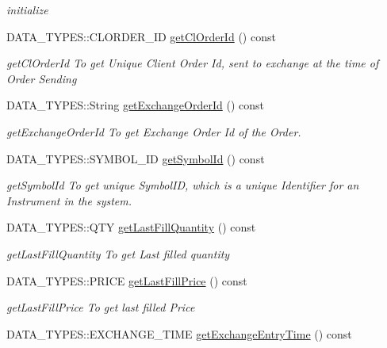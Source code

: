 \begin{DoxyCompactItemize}
\begin{DoxyCompactList}\small\item\em initialize \end{DoxyCompactList}\item 
D\-A\-T\-A\-\_\-\-T\-Y\-P\-E\-S\-::\-C\-L\-O\-R\-D\-E\-R\-\_\-\-I\-D \hyperlink{class_a_p_i2_1_1_order_confirmation_ac927e0347cdc6686a89478626c979a35}{get\-Cl\-Order\-Id} () const 
\begin{DoxyCompactList}\small\item\em get\-Cl\-Order\-Id To get Unique Client Order Id, sent to exchange at the time of Order Sending \end{DoxyCompactList}\item 
D\-A\-T\-A\-\_\-\-T\-Y\-P\-E\-S\-::\-String \hyperlink{class_a_p_i2_1_1_order_confirmation_a092cb6b14b04e741f1dedd08ef5af5ab}{get\-Exchange\-Order\-Id} () const 
\begin{DoxyCompactList}\small\item\em get\-Exchange\-Order\-Id To get Exchange Order Id of the Order. \end{DoxyCompactList}\item 
D\-A\-T\-A\-\_\-\-T\-Y\-P\-E\-S\-::\-S\-Y\-M\-B\-O\-L\-\_\-\-I\-D \hyperlink{class_a_p_i2_1_1_order_confirmation_a8d8956358d47151e1df3314a6e95aa90}{get\-Symbol\-Id} () const 
\begin{DoxyCompactList}\small\item\em get\-Symbol\-Id To get unique Symbol\-I\-D, which is a unique Identifier for an Instrument in the system. \end{DoxyCompactList}\item 
D\-A\-T\-A\-\_\-\-T\-Y\-P\-E\-S\-::\-Q\-T\-Y \hyperlink{class_a_p_i2_1_1_order_confirmation_ad43d155099d9eaa786e028bffc872fc9}{get\-Last\-Fill\-Quantity} () const 
\begin{DoxyCompactList}\small\item\em get\-Last\-Fill\-Quantity To get Last filled quantity \end{DoxyCompactList}\item 
D\-A\-T\-A\-\_\-\-T\-Y\-P\-E\-S\-::\-P\-R\-I\-C\-E \hyperlink{class_a_p_i2_1_1_order_confirmation_a60b3c4bb35cf21fe9545a33d806757f4}{get\-Last\-Fill\-Price} () const 
\begin{DoxyCompactList}\small\item\em get\-Last\-Fill\-Price To get last filled Price \end{DoxyCompactList}\item 
D\-A\-T\-A\-\_\-\-T\-Y\-P\-E\-S\-::\-E\-X\-C\-H\-A\-N\-G\-E\-\_\-\-T\-I\-M\-E \hyperlink{class_a_p_i2_1_1_order_confirmation_aacc316a7bfbf7b821b7826e364b60d2c}{get\-Exchange\-Entry\-Time} () const 

\end{DoxyCompactItemize}
